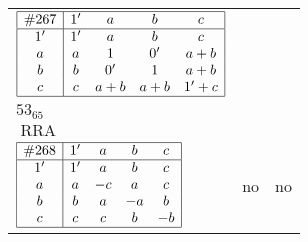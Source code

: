 \documentclass[12pt]{article}
\theoremstyle{definition}
\newcommand\RRA{\operatorname{RRA}}
\newcommand{\join}{\mathbin{+}}%
\newcommand{\id}{{1'}}%
\renewcommand{\div}{0'}
\renewcommand{\top}{1}%
\begin{document}
\begin{center}
\begin{longtable}{l|c|c}
$
\begin{array}{|c|cccc|} \hline
\#267 & \id & a & b & c \\ \hline
\id & \id & a & b & c \\
a & a & \top & \div & a \join b \\
b & b & \div & \top & a \join b \\
c & c & a \join b & a \join b & \id \join c \\ \hline
\end{array}
$
 & \begin{tabular}{c} yes \\ $53_{65}$ \\ $\RRA$ \end{tabular} 
 & \adjustbox{valign=c, max height=1.6cm}{$
\left[ \begin{array}{cccccc}
\id & a & a & b & c & c \\ 
a & \id & a & a & a & b \\ 
a & a & \id & b & b & b \\ 
b & a & b & \id & b & b \\ 
c & a & b & b & \id & c \\ 
c & b & b & b & c & \id
\end{array}\right]
$}      \\[15mm]

$
\begin{array}{|c|cccc|} \hline
\#268 & \id & a & b & c \\ \hline
\id & \id & a & b & c \\
a & a & -c & a & c \\
b & b & a & -a & b \\
c & c & c & b & -b \\ \hline
\end{array}
$
 & no  
 & no       \\[15mm]


\end{longtable}
\end{center}
\end{document}
